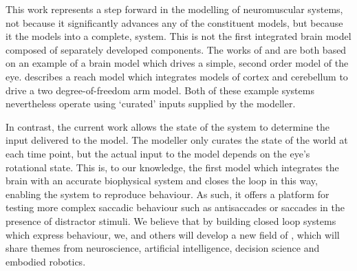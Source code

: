 This work represents a step forward in the modelling of neuromuscular systems,
not because it significantly advances any of the constituent models, but
because it  the models into a complete,  system.
This is not the first integrated brain model composed of separately developed
components. The works of \cite{nguyen_saccade_2014} and
\cite{thurat_biomimetic_2015} are both based
on an example of a brain model which drives a simple, second order model of the
eye. \cite{dewolf_spiking_2016} describes a reach model which integrates models
of cortex and cerebellum to drive a two degree-of-freedom arm model. Both of
these example systems nevertheless operate using `curated' inputs supplied
by the modeller.

In contrast, the current work allows the state of the system to determine the
input delivered to the model. The modeller only curates the state of the world
at each time point, but the actual input to the model depends on the eye's
rotational state.
This is, to our knowledge, the first model which integrates the brain with an
accurate biophysical system and closes the loop in this way, enabling the
system to reproduce behaviour.
As such, it offers a platform for testing more complex saccadic behaviour such as
antisaccades or saccades in the presence of distractor stimuli. We believe
that by building closed loop systems which express behaviour, we, and others
will develop a new field of , which will share
themes from neuroscience, artificial intelligence, decision science and embodied
robotics.
